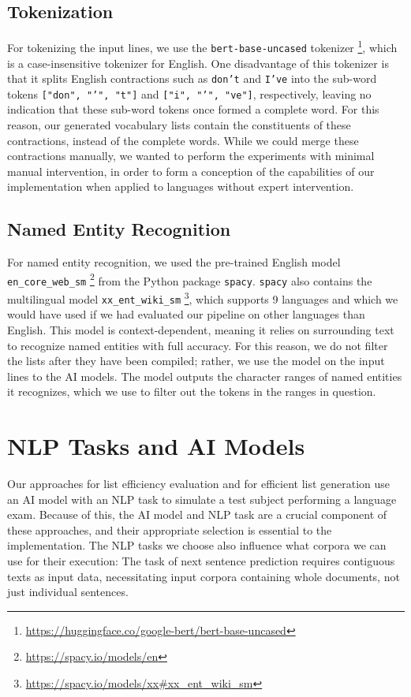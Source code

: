 \subsection{Tokenization}
For tokenizing the input lines, we use the \texttt{bert-base-uncased} tokenizer \footnote{\url{https://huggingface.co/google-bert/bert-base-uncased}}, which is a case-insensitive tokenizer for English.
One disadvantage of this tokenizer is that it splits English contractions such as \texttt{don't} and \texttt{I've} into the sub-word tokens \texttt{["don", "'", "t"]} and \texttt{["i", "'", "ve"]}, respectively, leaving no indication that these sub-word tokens once formed a complete word.
For this reason, our generated vocabulary lists contain the constituents of these contractions, instead of the complete words.
While we could merge these contractions manually, we wanted to perform the experiments with minimal manual intervention, in order to form a conception of the capabilities of our implementation when applied to languages without expert intervention.

\subsection{Named Entity Recognition}
For named entity recognition, we used the pre-trained English model \texttt{en\_core\_web\_sm} \footnote{\url{https://spacy.io/models/en}} from the Python package \texttt{spacy}.
\texttt{spacy} also contains the multilingual model \texttt{xx\_ent\_wiki\_sm} \footnote{\url{https://spacy.io/models/xx\#xx_ent_wiki_sm}}, which supports 9 languages and which we would have used if we had evaluated our pipeline on other languages than English.
This model is context-dependent, meaning it relies on surrounding text to recognize named entities with full accuracy.
For this reason, we do not filter the lists after they have been compiled; rather, we use the model on the input lines to the AI models.
The model outputs the character ranges of named entities it recognizes, which we use to filter out the tokens in the ranges in question.

\section{NLP Tasks and AI Models}
Our approaches for list efficiency evaluation and for efficient list generation use an AI model with an NLP task to simulate a test subject performing a language exam.
Because of this, the AI model and NLP task are a crucial component of these approaches, and their appropriate selection is essential to the implementation.
The NLP tasks we choose also influence what corpora we can use for their execution:
The task of next sentence prediction requires contiguous texts as input data, necessitating input corpora containing whole documents, not just individual sentences.

